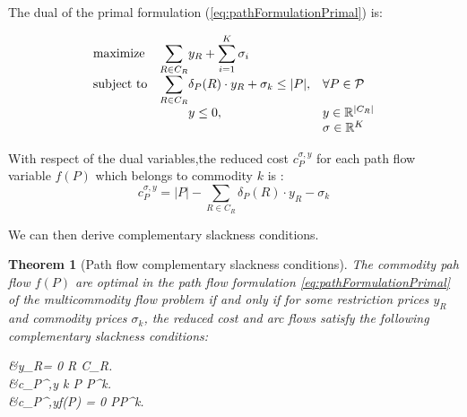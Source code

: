 \documentclass[14pt,a4paper]{article}
\newtheorem{theorem}{Theorem}[section]
\theoremstyle{definition}
\numberwithin{equation}{subsection}
\begin{document}
The dual of the primal formulation (\ref{eq:pathFormulationPrimal}) is:

\begin{equation}
\begin{array}{ll@{}lll}
\text{maximize}  &\displaystyle\sum\limits_{R \in C_R} &y_R  +\displaystyle\sum\limits_{i=1}^{K}\sigma_i &\\
\text{subject to}  & \displaystyle\sum\limits_{R \in C_R}   &\delta_P(R)\cdot y_R + \sigma_k \leq |P|,  &\forall P \in \mathcal{P}\\
 &                                               &y \leq 0, &y \in \mathbb{R}^{|C_R|} \\
 &												 & &\sigma \in \mathbb{R}^K\\
\end{array}
\label{eq:pathFormulationDual}
\end{equation}




With respect of the dual variables,the reduced cost $c_P^{\sigma,y}$ for each path flow variable $f(P)$ which belongs to commodity $k$ is :
\begin{equation}
 c_P^{\sigma,y} = |P| - \sum\limits_{R \in C_R}   \delta_P(R)\cdot y_R -\sigma_k
\label{eq:reducedCost}
\end{equation}


We can then derive complementary slackness conditions.

\begin{theorem}[Path flow complementary slackness conditions]
	The commodity pah flow $f(P)$ are optimal in the path flow formulation \eqref{eq:pathFormulationPrimal} of the multicommodity flow problem if and only if for some restriction prices $y_R$ and commodity prices $\sigma_k$, the reduced cost and arc flows satisfy the following complementary slackness conditions: 
	\begin{flalign}
	&y_R= 0  R \in C_R. \label{eq:cond1}\\
	&c_P^{\sigma,y}   k \in [K] P \in P^k. \label{eq:cond2}\\
	&c_P^{\sigma,y}\cdot f(P) = 0  \in [K]  P\in P^k. \label{eq:cond3}
	\end{flalign}
	\label{theorem:slackcond}
\end{theorem}
\end{document}
